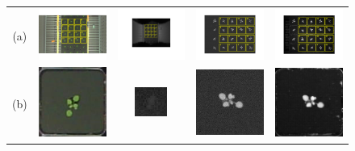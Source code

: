 \begin{figure}
\begin{centering}
\begin{tabular}{@{}c c c c c}
(a) &
\includegraphics[width=.23\textwidth]{Figures/FourModalities/A_rgb}&
\includegraphics[width=.23\textwidth]{Figures/FourModalities/A_depth}&
\includegraphics[width=.23\textwidth]{Figures/FourModalities/A_fmp}&
\includegraphics[width=.23\textwidth]{Figures/FourModalities/A_ir}\\
(b) &
\includegraphics[width=.1\textwidth]{Figures/FourModalities/A1_rgb}&
\includegraphics[width=.1\textwidth]{Figures/FourModalities/A1_depth}&
\includegraphics[width=.1\textwidth]{Figures/FourModalities/A1_fmp}&
\includegraphics[width=.1\textwidth]{Figures/FourModalities/A1_ir}\\

\end{tabular}
\end{centering}
\end{figure}
